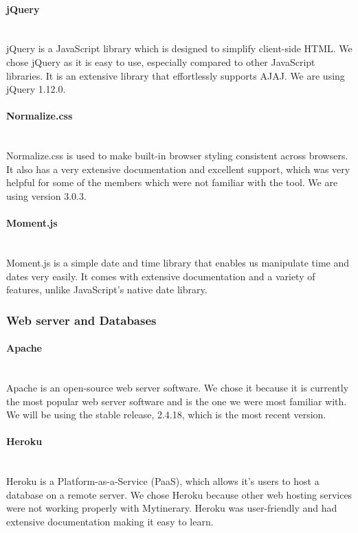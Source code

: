 \documentclass[12pt]{article}
\begin{document}
\paragraph*{jQuery}~\\
jQuery is a JavaScript library which is designed to simplify client-side HTML. We chose jQuery as it is easy to use, especially compared to other JavaScript libraries. It is an extensive library that effortlessly supports AJAJ. We are using jQuery 1.12.0.
%
\paragraph*{Normalize.css}~\\
Normalize.css is used to make built-in browser styling consistent across browsers. It also has a very extensive documentation and excellent support, which was very helpful for some of the members which were not familiar with the tool. We are using version 3.0.3.
%
\paragraph*{Moment.js}~\\
Moment.js is a simple date and time library that enables us manipulate time and dates very easily. It comes with extensive documentation and a variety of features, unlike JavaScript's native date library.
%
%
%
\subsubsection{Web server and Databases} \label{webanddata}
\paragraph*{Apache}~\\
Apache is an open-source web server software. We chose it because it is currently the most popular web server software and is the one we were most familiar with. We will be using the stable release, 2.4.18, which is the most recent version.
%
\paragraph*{Heroku}~\\
Heroku is a Platform-as-a-Service (PaaS), which allows it's users to host a database on a remote server. We chose Heroku because other web hosting services were not working properly with Mytinerary. Heroku was user-friendly and had extensive documentation making it easy to learn.
%
\end{document}

